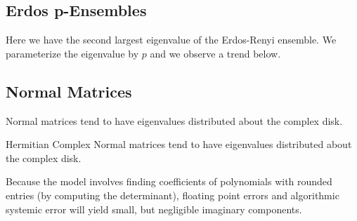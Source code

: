 \newpage

\subsection{Erdos p-Ensembles}

Here we have the second largest eigenvalue of the Erdos-Renyi ensemble. We parameterize the eigenvalue by $p$ and we observe a trend below.


\newpage
\subsection{Normal Matrices}

Normal matrices tend to have eigenvalues distributed about the complex disk.



Hermitian Complex Normal matrices tend to have eigenvalues distributed about the complex disk.

\begin{remark}
Because the model involves finding coefficients of polynomials with rounded entries (by computing the determinant), floating point errors and algorithmic systemic error will yield small, but negligible imaginary components.
\end{remark}

